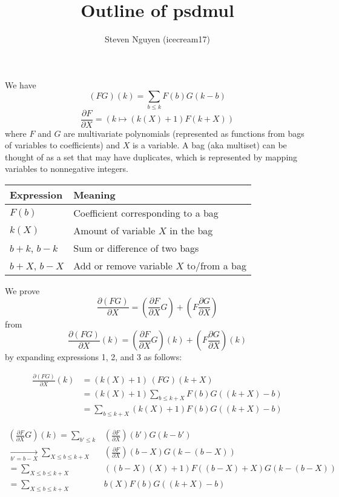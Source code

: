 \documentclass[]{article}
\title{Outline of psdmul}
\author{Steven Nguyen (icecream17)}
\begin{document}
\maketitle

\noindent{}We have
\[
    (FG)(k) = \sum_{b \le k} F(b) G(k-b) \tag{mul}\label{mul}
\]
\[
    \frac{\partial F}{\partial X} = \left( k \mapsto \left(k(X) + 1\right) F(k+X) \right) \tag{psd}\label{psd}
\]
where $F$ and $G$ are multivariate polynomials (represented as functions from bags of variables to coefficients) and $X$ is a variable. A bag (aka multiset) can be thought of as a set that may have duplicates, which is represented by mapping variables to nonnegative integers.

\begin{center}
\begin{tabular}{ll}
\toprule
Expression & Meaning \\
\midrule
$F(b)$     & Coefficient corresponding to a bag \\
$k(X)$     & Amount of variable $X$ in the bag \\
$b + k$, $b - k$ & Sum or difference of two bags \\
$b + X$, $b - X$ & Add or remove variable $X$ to/from a bag \\
\bottomrule
\end{tabular}
\end{center}
\setcounter{table}{1}

\noindent{}\hrulefill

\noindent{}We prove
\[
    \frac{\partial (FG)}{\partial X} = \left( \frac{\partial F}{\partial X} G \right) + \left( F \frac{\partial G}{\partial X} \right)
\]
from
\[
    \frac{\partial (FG)}{\partial X}(k) = \left( \frac{\partial F}{\partial X} G \right)\!\!(k) + \left( F \frac{\partial G}{\partial X} \right)\!\!(k) \tag{1 = 2 + 3}
\]
by expanding expressions 1, 2, and 3 as follows:

\vspace{-1em}
\begin{align*}
\frac{\partial (FG)}{\partial X}(k)  &= (k(X) + 1) \, (FG)(k+X) \\
&= (k(X) + 1) \sum_{b \le k+X} F(b) G((k+X)-b) \\
&= \sum_{b \le k+X} (k(X) + 1) F(b) G((k+X)-b)  \tag{1}\label{1}
\end{align*}
\hrulefill

\vspace{-1em}
\begin{align*}
\left( \frac{\partial F}{\partial X} G \right)\!\!(k)
= \sum_{b' \le k}& \left( \frac{\partial F}{\partial X} \right)\!\!(b') G(k-b') \\
\underset{b' = b - X}{\longrightarrow} \sum_{X \le b \le k+X}& \left( \frac{\partial F}{\partial X} \right)\!\!(b-X) G(k-(b-X)) \\
= \sum_{X \le b \le k+X}& ((b-X)(X) + 1) F((b-X)+X) G(k-(b-X)) \\
= \sum_{X \le b \le k+X}& b(X) F(b) G((k+X)-b)  \tag{2}\label{2}
\end{align*}
\hrulefill
\end{document}
